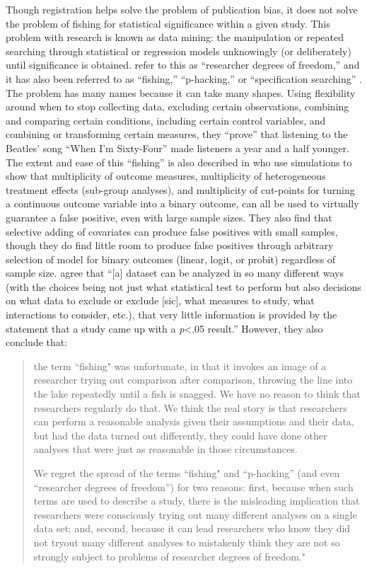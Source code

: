 \documentclass[12pt] {article}
\begin{document}
Though registration helps solve the problem of publication bias, it does
not solve the problem of fishing for statistical significance within a
given study. This problem with research is known as data mining: the manipulation or repeated searching through statistical or regression
models unknowingly (or deliberately) until significance is obtained.
 \cite{simmons_false-positive_2011} refer to this as
``researcher degrees of freedom,'' and it has also been referred to as
``fishing,'' ``p-hacking,'' or ``specification searching'' \citep{humphreys_fishing_2013}. The problem has many names because it can take many shapes. Using flexibility around when to stop
collecting data, excluding certain observations, combining and comparing
certain conditions, including certain control variables, and combining
or transforming certain measures, they ``prove'' that listening to the
Beatles' song ``When I'm Sixty-Four'' made listeners a year and a half
younger. The extent and ease of this ``fishing'' is also described in
\cite{humphreys_fishing_2013} who use simulations to show that multiplicity of outcome measures, multiplicity of heterogeneous treatment effects (sub-group analyses), and multiplicity of cut-points for turning a continuous outcome variable into a binary outcome, can all be used to virtually guarantee a false positive, even with large sample sizes. They also find that selective adding of covariates can produce false positives with small samples, though they do find little room to produce false positives through arbitrary selection of model for binary outcomes (linear, logit, or probit) regardless of sample size. \cite{gelman_garden_2013} agree that
``{[}a{]} dataset can be analyzed in so many different ways (with the
choices being not just what statistical test to perform but also
decisions on what data to exclude or exclude {[}sic{]}, what measures to
study, what interactions to consider, etc.), that very little
information is provided by the statement that a study came up with a
\emph{p}\textless{}.05 result.'' However, they also conclude that:

\begin{quote}
the term ``fishing" was unfortunate, in that it invokes an image of a
researcher trying out comparison after comparison, throwing the line
into the lake repeatedly until a fish is snagged. We have no reason to
think that researchers regularly do that. We think the real story is
that researchers can perform a reasonable analysis given their
assumptions and their data, but had the data turned out differently,
they could have done other analyses that were just as reasonable in
those circumstances.

We regret the spread of the terms ``fishing" and ``p-hacking'' (and even
``researcher degrees of freedom'') for two reasons: first, because when
such terms are used to describe a study, there is the misleading
implication that researchers were consciously trying out many different
analyses on a single data set; and, second, because it can lead
researchers who know they did not tryout many different analyses to
mistakenly think they are not so strongly subject to problems of
researcher degrees of freedom."
\end{quote}
\end{document}
